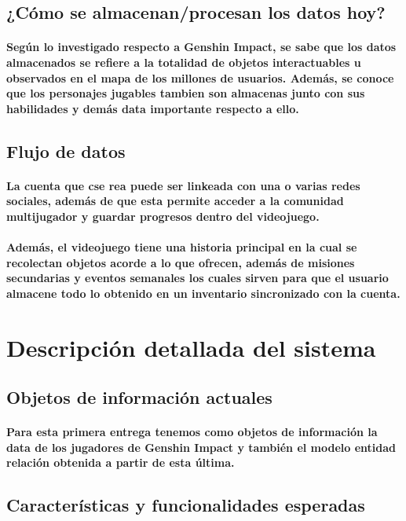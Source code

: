 \documentclass{report}
\begin{document}
\subsection{¿Cómo se almacenan/procesan los datos hoy?}
\paragraph{Según lo investigado respecto a Genshin Impact, se sabe que los datos almacenados se refiere a la totalidad de objetos interactuables u observados en el mapa de los millones de usuarios. Además, se conoce que los personajes jugables tambien son almacenas junto con sus habilidades y demás data importante respecto a ello.}
\subsection{Flujo de datos}
\paragraph{La cuenta que cse rea puede ser linkeada con una o varias redes sociales, además de que esta permite acceder a la comunidad multijugador y guardar progresos dentro del videojuego.}
\paragraph{Además, el videojuego tiene una historia principal en la cual se recolectan objetos acorde a lo que ofrecen, además de misiones secundarias y eventos semanales los cuales sirven para que el usuario almacene todo lo obtenido en un inventario sincronizado con la cuenta.}

\section{Descripción detallada del sistema}
\subsection{Objetos de información actuales}
\paragraph{Para esta primera entrega tenemos como objetos de información la data de los jugadores de Genshin Impact y también el modelo entidad relación obtenida a partir de esta última.}

\subsection{Características y funcionalidades esperadas}
\end{document}

